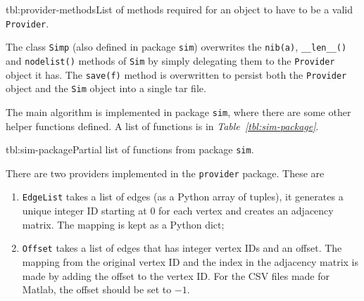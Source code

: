 \documentclass[12pt]{report}
\begin{document}
\begin{methodListC}{tbl:provider-methods}{List of methods required for an object
  to have to be a valid {\tt Provider}.}
\end{methodListC}


The class {\tt Simp} (also defined in package {\tt sim}) overwrites the
{\tt nib(a)}, {\tt \_\_len\_\_()} and {\tt nodelist()} methods of {\tt Sim} by
simply delegating them to the {\tt Provider} object it has. The {\tt save(f)}
method is overwritten to persist both the {\tt Provider} object and the
{\tt Sim} object into a single tar file.

The main algorithm is implemented in package {\tt sim}, where there are some
other helper functions defined. A list of functions is in
\emph{Table~\ref{tbl:sim-package}}.

\begin{methodListC}{tbl:sim-package}{Partial list of functions from package
  {\tt sim}.}
\end{methodListC}

There are two providers implemented in the {\tt provider} package. These are
\begin{enumerate}
  \item {\tt EdgeList} takes a list of edges (as a Python array of tuples), it
  generates a unique integer ID starting at 0 for each vertex and creates an
  adjacency matrix. The mapping is kept as a Python dict;
  \item {\tt Offset} takes a list of edges that has integer vertex IDs and an offset.
  The mapping from the original vertex ID and the index in the adjacency matrix is
  made by adding the offset to the vertex ID. For the CSV files made for Matlab,
  the offset should be set to $-1$.
\end{enumerate}
\end{document}
